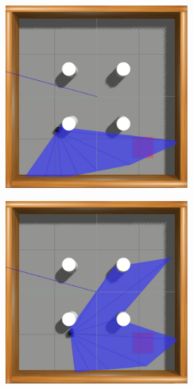 \begin{figure}[H]
\begin{center}
\begin{subfigure}[b]{0.60\textwidth}
\begin{subfigure}[b]{0.24\textwidth}
        \end{subfigure}
        \hfill
        \begin{subfigure}[b]{0.24\textwidth}
            \includegraphics[width=\textwidth]{imagens/simulated_envs/sim_env2_ddpg/3.png}
        \end{subfigure}
        \hfill
        \begin{subfigure}[b]{0.24\textwidth}
            \includegraphics[width=\textwidth]{imagens/simulated_envs/sim_env2_ddpg/4.png}
        \end{subfigure}
        

\end{subfigure}
\end{center}
\end{figure}
